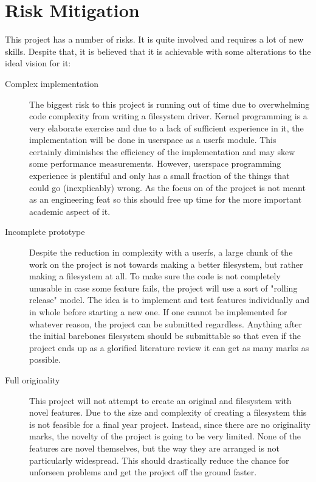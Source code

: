 %
%
\section{Risk Mitigation}

    This project has a number of risks. It is quite involved and requires a lot
    of new skills. Despite that, it is believed that it is achievable with some
    alterations to the ideal vision for it:

    \begin{description}

        \item[Complex implementation] The biggest risk to this project is
            running out of time due to overwhelming code complexity from
            writing a filesystem driver. Kernel programming is a very elaborate
            exercise and due to a lack of sufficient experience in it, the
            implementation will be done in userspace as a userfs module. This
            certainly diminishes the efficiency of the implementation and may
            skew some performance measurements. However, userspace programming
            experience is plentiful and only has a small fraction of the things
            that could go (inexplicably) wrong. As the focus on of the project
            is not meant as an engineering feat so this should free up time for
            the more important academic aspect of it.

        \item[Incomplete prototype] Despite the reduction in complexity with a
            userfs, a large chunk of the work on the project is not towards
            making a better filesystem, but rather making a filesystem at all.
            To make sure the code is not completely unusable in case some
            feature fails, the project will use a sort of "rolling release"
            model. The idea is to implement and test features individually and
            in whole before starting a new one. If one cannot be implemented
            for whatever reason, the project can be submitted regardless.
            Anything after the initial barebones filesystem should be
            submittable so that even if the project ends up as a glorified
            literature review it can get as many marks as possible.

        \item[Full originality] This project will not attempt to create an
            original and filesystem with novel features. Due to the size and
            complexity of creating a filesystem this is not feasible for a
            final year project. Instead, since there are no originality marks,
            the novelty of the project is going to be very limited. None of the
            features are novel themselves, but the way they are arranged is not
            particularly widespread. This should drastically reduce the chance
            for unforseen problems and get the project off the ground faster.


\end{description}
